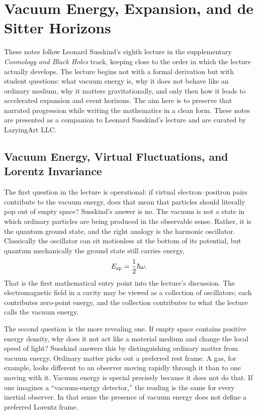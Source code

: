 \chapter{Vacuum Energy, Expansion, and de Sitter Horizons}

These notes follow Leonard Susskind's eighth lecture in the supplementary \emph{Cosmology and Black Holes} track, keeping close to the order in which the lecture actually develops. The lecture begins not with a formal derivation but with student questions: what vacuum energy is, why it does not behave like an ordinary medium, why it matters gravitationally, and only then how it leads to accelerated expansion and event horizons. The aim here is to preserve that narrated progression while writing the mathematics in a clean form. These notes are presented as a companion to Leonard Susskind's lecture and are curated by LazyingArt LLC.

\section{Vacuum Energy, Virtual Fluctuations, and Lorentz Invariance}

The first question in the lecture is operational: if virtual electron--positron pairs contribute to the vacuum energy, does that mean that particles should literally pop out of empty space? Susskind's answer is no. The vacuum is not a state in which ordinary particles are being produced in the observable sense. Rather, it is the quantum ground state, and the right analogy is the harmonic oscillator. Classically the oscillator can sit motionless at the bottom of its potential, but quantum mechanically the ground state still carries energy,
\begin{equation}
E_{\rm zp}=\frac{1}{2}\hbar\omega.
\end{equation}
That is the first mathematical entry point into the lecture's discussion. The electromagnetic field in a cavity may be viewed as a collection of oscillators; each contributes zero-point energy, and the collection contributes to what the lecture calls the vacuum energy.

The second question is the more revealing one. If empty space contains positive energy density, why does it not act like a material medium and change the local speed of light? Susskind answers this by distinguishing ordinary matter from vacuum energy. Ordinary matter picks out a preferred rest frame. A gas, for example, looks different to an observer moving rapidly through it than to one moving with it. Vacuum energy is special precisely because it does not do that. If one imagines a ``vacuum-energy detector,'' the reading is the same for every inertial observer. In that sense the presence of vacuum energy does not define a preferred Lorentz frame.

